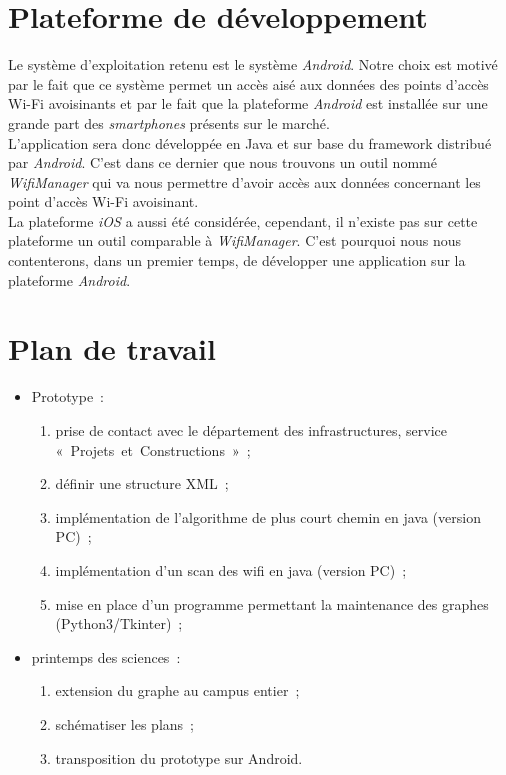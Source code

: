 \documentclass[a4paper,11pt]{article}
\begin{document}
\section{Plateforme de développement}
	Le système d'exploitation retenu est le système \textit{Android}. Notre choix est motivé par le fait que ce système permet un accès aisé aux données des points d'accès Wi-Fi avoisinants et par le fait que la plateforme \textit{Android} est installée sur une grande part des \textit{smartphones} présents sur le marché.\\
	L'application sera donc développée en Java et sur base du framework distribué par \textit{Android}. C'est dans ce dernier que nous trouvons un outil nommé \textit{WifiManager} qui va nous permettre d'avoir accès aux données concernant les point d'accès Wi-Fi avoisinant.\\
	La plateforme \textit{iOS} a aussi été considérée, cependant, il n'existe pas sur cette plateforme un outil comparable à \textit{WifiManager}. C'est pourquoi nous nous contenterons, dans un premier temps, de développer une application sur la plateforme \textit{Android}.

\section{Plan de travail}
  \begin{itemize}
	\item Prototype~:
	  \begin{enumerate}
	    \item prise de contact avec le département des infrastructures, service «~Projets~et~Constructions~»~;
	    \item définir une structure XML~;
	    \item implémentation de l'algorithme de plus court chemin en java (version PC)~;
	    \item implémentation d'un scan des wifi en java (version PC)~;
	    \item mise en place d'un programme permettant la maintenance des graphes (Python3/Tkinter)~;
	  \end{enumerate}
	\item printemps des sciences~:
	  \begin{enumerate}
	    \item extension du graphe au campus entier~;
	    \item schématiser les plans~;
	    \item transposition du prototype sur Android.
	  \end{enumerate}
  \end{itemize}
  
\end{document}

